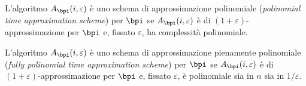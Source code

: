 \begin{definition}[PTAS]
    \label{def:ptas}
    L'algoritmo
    $A_{\bpi} (i,\varepsilon)$
    è uno schema di approssimazione polinomiale
    (\emph{polinomial time approximation scheme})
    per $\bpi$ se
    $A_{\bpi} (i,\varepsilon)$
    è di $(1+\varepsilon)$-approssimazione per $\bpi$
    e, fissato $\varepsilon$, ha complessità polinomiale.
\end{definition}

\begin{definition}[FPTAS]
    \label{def:fptas}
    L'algoritmo
    $A_{\bpi} (i,\varepsilon)$
    è uno schema di approssimazione pienamente polinomiale
    (\emph{fully polinomial time approximation scheme})
    per $\bpi$ se
    $A_{\bpi} (i,\varepsilon)$
    è di $(1+\varepsilon)$-approssimazione per $\bpi$
    e, fissato $\varepsilon$, è polinomiale sia in $n$ sia in $1/\varepsilon$.
\end{definition}

